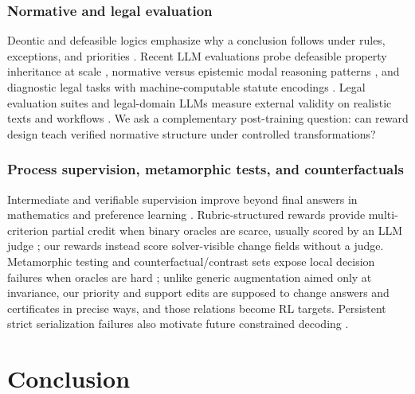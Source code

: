 \documentclass[letterpaper]{article}
\begin{document}
\subsubsection{Normative and legal evaluation}
Deontic and defeasible logics emphasize why a conclusion follows under rules, exceptions, and priorities \cite{vonwright1951deontic,nute1994defeasible,prakken2015law}. Recent LLM evaluations probe defeasible property inheritance at scale \cite{allaway2025defreasing}, normative versus epistemic modal reasoning patterns \cite{ozeki2025normative}, and diagnostic legal tasks with machine-computable statute encodings \cite{servantez2026openexempt}. Legal evaluation suites and legal-domain LLMs measure external validity on realistic texts and workflows \cite{chalkidis2022lexglue,guha2023legalbench,fei2024lawbench,colombo2024saullm}. We ask a complementary post-training question: can reward design teach verified normative structure under controlled transformations?

\subsubsection{Process supervision, metamorphic tests, and counterfactuals}
Intermediate and verifiable supervision improve beyond final answers in mathematics and preference learning \cite{cobbe2021gsm8k,lightman2023letsverify,christiano2017deep,ouyang2022training,shao2024deepseekmath,deepseekai2025r1}. Rubric-structured rewards provide multi-criterion partial credit when binary oracles are scarce, usually scored by an LLM judge \cite{gunjal2025rubrics}; our rewards instead score solver-visible change fields without a judge. Metamorphic testing and counterfactual/contrast sets expose local decision failures when oracles are hard \cite{chen1998metamorphic,chen2018metamorphic,kaushik2020counterfactual,gardner2020contrast}; unlike generic augmentation aimed only at invariance, our priority and support edits are supposed to change answers and certificates in precise ways, and those relations become RL targets. Persistent strict serialization failures also motivate future constrained decoding \cite{scholak2021picard}.

\section{Conclusion}
\end{document}
